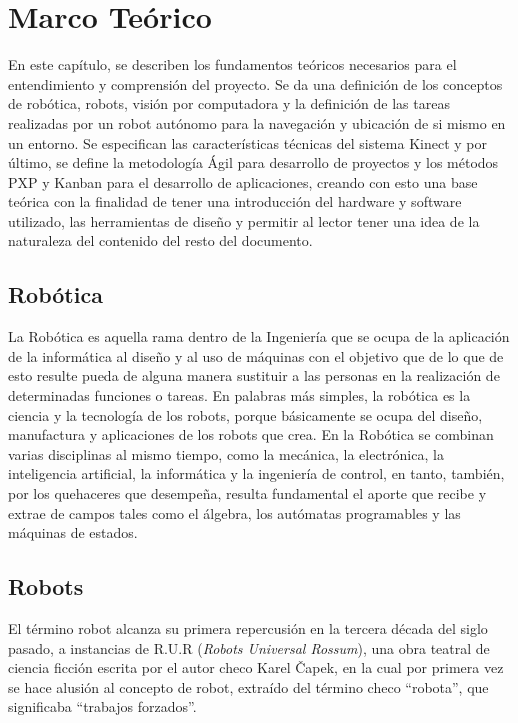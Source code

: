 \chapter{Marco Teórico}

En este capítulo, se describen los fundamentos teóricos necesarios para el entendimiento y comprensión del proyecto. Se da una definición de los conceptos de robótica, robots, visión por computadora y la definición de las tareas realizadas por un robot autónomo para la navegación y ubicación de si mismo en un entorno. Se especifican las características técnicas del sistema Kinect y por último, se define la metodología Ágil para desarrollo de proyectos y los métodos PXP y Kanban para el desarrollo de aplicaciones, creando con esto una base teórica con la finalidad de tener una introducción del hardware y software utilizado, las herramientas de diseño y permitir al lector tener una idea de la naturaleza del contenido del resto del documento.

\section{Robótica}
La Robótica es aquella rama dentro de la Ingeniería que se ocupa de la aplicación de la informática al diseño y al uso de máquinas con el objetivo que de lo que de esto resulte pueda de alguna manera sustituir a las personas en la realización de determinadas funciones o tareas.
En palabras más simples, la robótica es la ciencia y la tecnología de los robots, porque básicamente se ocupa del diseño, manufactura y aplicaciones de los robots que crea. En la Robótica se combinan varias disciplinas al mismo tiempo, como la mecánica, la electrónica, la inteligencia artificial, la informática y la ingeniería de control, en tanto, también, por los quehaceres que desempeña, resulta fundamental el aporte que recibe y extrae de campos tales como el álgebra, los autómatas programables y las máquinas de estados.

\section{Robots}
El término robot alcanza su primera repercusión en la tercera década del siglo pasado, a instancias de R.U.R (\textit{Robots Universal Rossum}), una obra teatral de ciencia ficción escrita por el autor checo Karel Čapek, en la cual por primera vez se hace alusión al concepto de robot, extraído del término checo ``robota'', que significaba ``trabajos forzados''.

